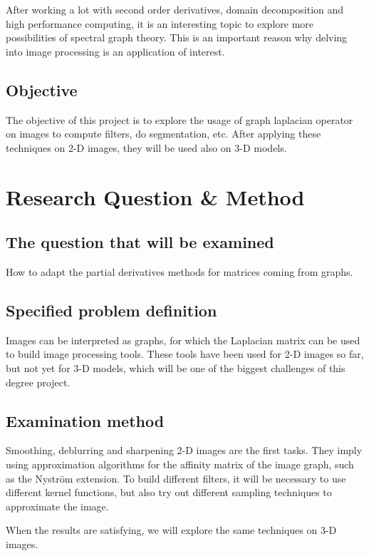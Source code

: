 \documentclass[12pt]{article}
\begin{document}
After working a lot with second order derivatives, domain decomposition and high performance computing, it is an interesting topic to explore more possibilities of spectral graph theory.
This is an important reason why delving into image processing is an application of interest.

\subsection*{Objective}

The objective of this project is to explore the usage of graph laplacian operator on images to compute filters, do segmentation, etc.
After applying these techniques on 2-D images, they will be used also on 3-D models.

\section*{Research Question \& Method}

\subsection*{The question that will be examined}

How to adapt the partial derivatives methods for matrices coming from graphs.

\subsection*{Specified problem definition}

Images can be interpreted as graphs, for which the Laplacian matrix can be used to build image processing tools.
These tools have been used for 2-D images so far, but not yet for 3-D models, which will be one of the biggest challenges of this degree project.

\subsection*{Examination method}

Smoothing, deblurring and sharpening 2-D images are the first tasks.
They imply using approximation algorithms for the affinity matrix of the image graph, such as the Nystr\"om extension.
To build different filters, it will be necessary to use different kernel functions, but also try out different sampling techniques to approximate the image.

When the results are satisfying, we will explore the same techniques on 3-D images.
\end{document}
